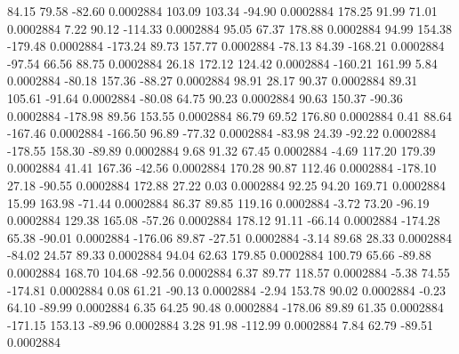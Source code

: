        84.15       79.58      -82.60     0.0002884
      103.09      103.34      -94.90     0.0002884
      178.25       91.99       71.01     0.0002884
        7.22       90.12     -114.33     0.0002884
       95.05       67.37      178.88     0.0002884
       94.99      154.38     -179.48     0.0002884
     -173.24       89.73      157.77     0.0002884
      -78.13       84.39     -168.21     0.0002884
      -97.54       66.56       88.75     0.0002884
       26.18      172.12      124.42     0.0002884
     -160.21      161.99        5.84     0.0002884
      -80.18      157.36      -88.27     0.0002884
       98.91       28.17       90.37     0.0002884
       89.31      105.61      -91.64     0.0002884
      -80.08       64.75       90.23     0.0002884
       90.63      150.37      -90.36     0.0002884
     -178.98       89.56      153.55     0.0002884
       86.79       69.52      176.80     0.0002884
        0.41       88.64     -167.46     0.0002884
     -166.50       96.89      -77.32     0.0002884
      -83.98       24.39      -92.22     0.0002884
     -178.55      158.30      -89.89     0.0002884
        9.68       91.32       67.45     0.0002884
       -4.69      117.20      179.39     0.0002884
       41.41      167.36      -42.56     0.0002884
      170.28       90.87      112.46     0.0002884
     -178.10       27.18      -90.55     0.0002884
      172.88       27.22        0.03     0.0002884
       92.25       94.20      169.71     0.0002884
       15.99      163.98      -71.44     0.0002884
       86.37       89.85      119.16     0.0002884
       -3.72       73.20      -96.19     0.0002884
      129.38      165.08      -57.26     0.0002884
      178.12       91.11      -66.14     0.0002884
     -174.28       65.38      -90.01     0.0002884
     -176.06       89.87      -27.51     0.0002884
       -3.14       89.68       28.33     0.0002884
      -84.02       24.57       89.33     0.0002884
       94.04       62.63      179.85     0.0002884
      100.79       65.66      -89.88     0.0002884
      168.70      104.68      -92.56     0.0002884
        6.37       89.77      118.57     0.0002884
       -5.38       74.55     -174.81     0.0002884
        0.08       61.21      -90.13     0.0002884
       -2.94      153.78       90.02     0.0002884
       -0.23       64.10      -89.99     0.0002884
        6.35       64.25       90.48     0.0002884
     -178.06       89.89       61.35     0.0002884
     -171.15      153.13      -89.96     0.0002884
        3.28       91.98     -112.99     0.0002884
        7.84       62.79      -89.51     0.0002884
